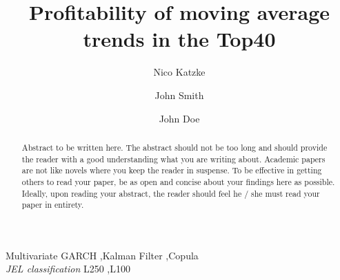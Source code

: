\documentclass[12pt,preprint, authoryear]{elsarticle}
\numberwithin{equation}{section}
\numberwithin{figure}{section}
\numberwithin{table}{section}
\begin{document}
\begin{frontmatter}  %

\title{Profitability of moving average trends in the Top40}

\author[Add1]{Nico Katzke}

\author[Add1,Add2]{John Smith}

\author[Add1,Add2]{John Doe}



\address[Add1]{Bureau for Economic Research, Stellenbosch University, South Africa}
\address[Add2]{Some other Institution, Cape Town, South Africa}


\begin{abstract}
\small{
Abstract to be written here. The abstract should not be too long and
should provide the reader with a good understanding what you are writing
about. Academic papers are not like novels where you keep the reader in
suspense. To be effective in getting others to read your paper, be as
open and concise about your findings here as possible. Ideally, upon
reading your abstract, the reader should feel he / she must read your
paper in entirety.
}
\end{abstract}

\vspace{1cm}

\begin{keyword}
\footnotesize{
Multivariate GARCH \sep Kalman Filter \sep Copula \\ \vspace{0.3cm}
\textit{JEL classification} L250 \sep L100
}
\end{keyword}
\vspace{0.5cm}
\end{frontmatter}



\pagestyle{fancy}
\chead{}
\rhead{}
\lfoot{}
\lhead{}
\cfoot{}


\headsep 35pt %
\end{document}
